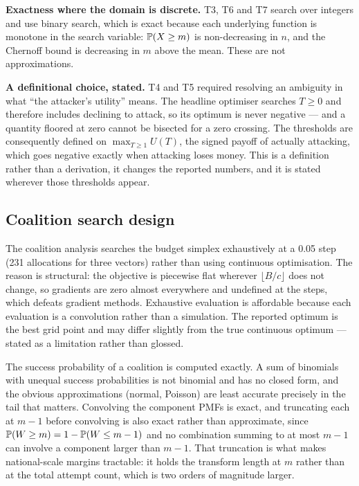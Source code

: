\textbf{Exactness where the domain is discrete.} T3, T6 and T7 search
over integers and use binary search, which is exact because each
underlying function is monotone in the search variable: $\mathbb{P}(X \geq
m)$ is non-decreasing in $n$, and the Chernoff bound is decreasing in
$m$ above the mean. These are not approximations.

\textbf{A definitional choice, stated.} T4 and T5 required resolving an
ambiguity in what ``the attacker's utility'' means. The headline
optimiser searches $T \geq 0$ and therefore includes declining to
attack, so its optimum is never negative --- and a quantity floored at
zero cannot be bisected for a zero crossing. The thresholds are
consequently defined on $\max_{T \geq 1} U(T)$, the signed payoff of
actually attacking, which goes negative exactly when attacking loses
money. This is a definition rather than a derivation, it changes the
reported numbers, and it is stated wherever those thresholds appear.

\subsection{Coalition search design}
\label{sec:method-coalition}

The coalition analysis searches the budget simplex exhaustively at a
0.05 step (231 allocations for three vectors) rather than using
continuous optimisation. The reason is structural: the objective is
piecewise flat wherever $\lfloor B/c \rfloor$ does not change, so
gradients are zero almost everywhere and undefined at the steps, which
defeats gradient methods. Exhaustive evaluation is affordable because
each evaluation is a convolution rather than a simulation. The reported
optimum is the best grid point and may differ slightly from the true
continuous optimum --- stated as a limitation rather than glossed.

The success probability of a coalition is computed exactly. A sum of
binomials with unequal success probabilities is not binomial and has no
closed form, and the obvious approximations (normal, Poisson) are least
accurate precisely in the tail that matters. Convolving the component
PMFs is exact, and truncating each at $m-1$ before convolving is also
exact rather than approximate, since $\mathbb{P}(W \geq m) = 1 - \mathbb{P}(W
\leq m-1)$ and no combination summing to at most $m-1$ can involve a
component larger than $m-1$. That truncation is what makes
national-scale margins tractable: it holds the transform length at $m$
rather than at the total attempt count, which is two orders of
magnitude larger.

